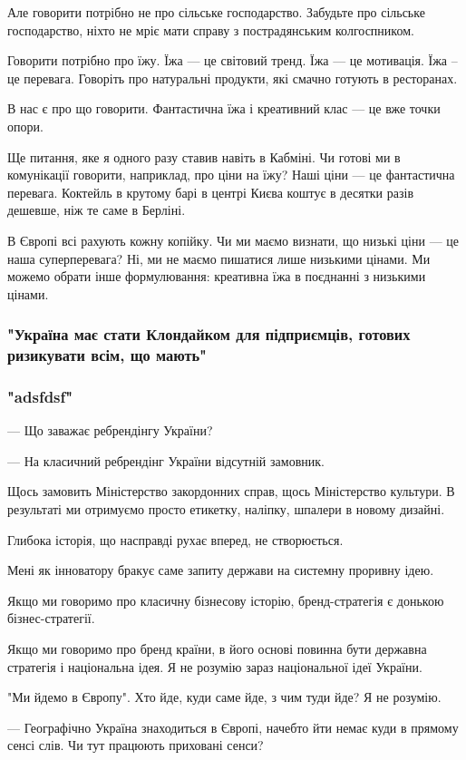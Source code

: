 Але говорити потрібно не про сільське господарство. Забудьте про сільське
господарство, ніхто не мріє мати справу з пострадянським колгоспником. 

Говорити потрібно про їжу. Їжа --- це світовий тренд. Їжа --- це мотивація. Їжа –
це перевага. Говоріть про натуральні продукти, які смачно готують в ресторанах. 

В нас є про що говорити. Фантастична їжа і креативний клас --- це вже точки
опори.

Ще питання, яке я одного разу ставив навіть в Кабміні. Чи готові ми в
комунікації говорити, наприклад, про ціни на їжу? Наші ціни --- це фантастична
перевага. Коктейль в крутому барі в центрі Києва коштує в десятки разів
дешевше, ніж те саме в Берліні.

В Європі всі рахують кожну копійку. Чи ми маємо визнати, що низькі ціни --- це
наша суперперевага? Ні, ми не маємо пишатися лише низькими цінами. Ми можемо
обрати інше формулювання: креативна їжа в поєднанні з низькими цінами.

\subsubsection{"Україна має стати Клондайком для підприємців, готових ризикувати всім, що мають"}
\subsubsection{"adsfdsf"}

--- Що заважає ребрендінгу України?

--- На класичний ребрендінг України відсутній замовник.

Щось замовить Міністерство закордонних справ, щось Міністерство культури. В
результаті ми отримуємо просто етикетку, наліпку, шпалери в новому дизайні.

Глибока історія, що насправді рухає вперед, не створюється.

Мені як інноватору бракує саме запиту держави на системну проривну ідею.

Якщо ми говоримо про класичну бізнесову історію, бренд-стратегія є донькою
бізнес-стратегії. 

Якщо ми говоримо про бренд країни, в його основі повинна бути державна
стратегія і національна ідея. Я не розумію зараз національної ідеї України.

"Ми йдемо в Європу". Хто йде, куди саме йде, з чим туди йде? Я не розумію.

--- Географічно Україна знаходиться в Європі, начебто йти немає куди в прямому
сенсі слів. Чи тут працюють приховані сенси?

